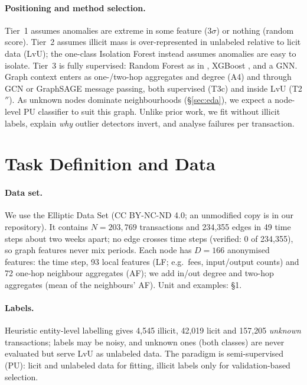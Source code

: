\documentclass[11pt]{article}
\newcommand{\ours}{LvU}
\begin{document}
\paragraph{Positioning and method selection.}
Tier~1 assumes anomalies are extreme in some feature (3$\sigma$) or nothing (random score).
Tier~2 assumes illicit mass is over-represented in unlabeled relative to licit data (\ours{}); the one-class Isolation Forest \citep{liu2008iforest} instead assumes anomalies are easy to isolate.
Tier~3 is fully supervised: Random Forest \citep{breiman2001rf} as in \citet{weber2019aml}, XGBoost \citep{chen2016xgboost}, and a GNN.
Graph context enters as one-/two-hop aggregates and degree (A4) and through GCN \citep{kipf2017gcn} or GraphSAGE \citep{hamilton2017graphsage} message passing, both supervised (T3c) and inside \ours{} (T2$''$).
As unknown nodes dominate neighbourhoods (\S\ref{sec:eda}), we expect a node-level PU classifier to suit this graph. Unlike prior work, we fit without illicit labels, explain \emph{why} outlier detectors invert, and analyse failures per transaction.

\section{Task Definition and Data}
\label{sec:data}

\paragraph{Data set.}
We use the Elliptic Data Set \citep{weber2019aml,elliptic2019data} (CC BY-NC-ND 4.0; an unmodified copy is in our repository).
It contains $N=203{,}769$ transactions and 234,355 edges in 49 time steps about two weeks apart; no edge crosses time steps (verified: 0 of 234,355), so graph features never mix periods.
Each node has $D=166$ anonymised features: the time step, 93 local features (LF; e.g.\ fees, input/output counts) and 72 one-hop neighbour aggregates (AF); we add in/out degree and two-hop aggregates (mean of the neighbours' AF). Unit and examples: \S1.

\paragraph{Labels.}
Heuristic entity-level labelling \citep{weber2019aml} gives 4,545 illicit, 42,019 licit and 157,205 \emph{unknown} transactions; labels may be noisy, and unknown ones (both classes) are never evaluated but serve \ours{} as unlabeled data.
The paradigm is semi-supervised (PU): licit and unlabeled data for fitting, illicit labels only for validation-based selection.
\end{document}
